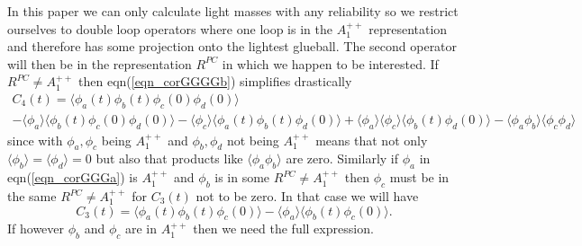 \documentclass[12pt]{article}
\newcommand{\be}{\begin{equation}}
\newcommand{\ee}{\end{equation}}
\begin{document}
\begin{appendix}
In this paper we can only calculate light masses with any reliability so we restrict ourselves
to double loop operators where one loop is in the $A_1^{++}$ representation and therefore has
some projection onto the lightest glueball. The second operator will then be in the representation
$R^{PC}$ in which we happen to be interested. If $R^{PC} \neq A_1^{++}$ then eqn(\ref{eqn_corGGGGb})
simplifies drastically 
%
\begin{multline}
C_4(t) = \langle \phi_a(t)\phi_b(t) \phi_c(0)\phi_d(0) \rangle \\
-\langle\phi_a\rangle \langle\phi_b(t)\phi_c(0)\phi_d(0) \rangle
-\langle\phi_c\rangle \langle\phi_a(t)\phi_b(t)\phi_d(0) \rangle
+\langle\phi_a\rangle \langle\phi_c\rangle \langle \phi_b(t)\phi_d(0) \rangle
-\langle\phi_a\phi_b\rangle \langle\phi_c\phi_d\rangle
\label{eqn_corGGGGd}
\end{multline}
%
since with $\phi_a,\phi_c$ being $A_1^{++}$ and $\phi_b,\phi_d$ not being $A_1^{++}$ means
that not only $\langle \phi_b\rangle = \langle \phi_d\rangle = 0$ but also that
products like  $\langle \phi_a \phi_b\rangle$ are zero. Similarly if  $\phi_a$ in
eqn(\ref{eqn_corGGGa}) is $A_1^{++}$ and  $\phi_b$ is in some $R^{PC} \neq A_1^{++}$ then
$\phi_c$ must be in the same $R^{PC} \neq A_1^{++}$ for $C_3(t)$ not to be zero.
In that case we will have
%
\be
C_3(t) = \langle \phi_a(t)\phi_b(t) \phi_c(0) \rangle 
-\langle\phi_a\rangle \langle\phi_b(t)\phi_c(0) \rangle.
\label{eqn_corGGGc}
\ee
%
If however $\phi_b$ and $\phi_c$ are in $A_1^{++}$ then we need the full expression.




\end{appendix}

\clearpage
\end{document}
